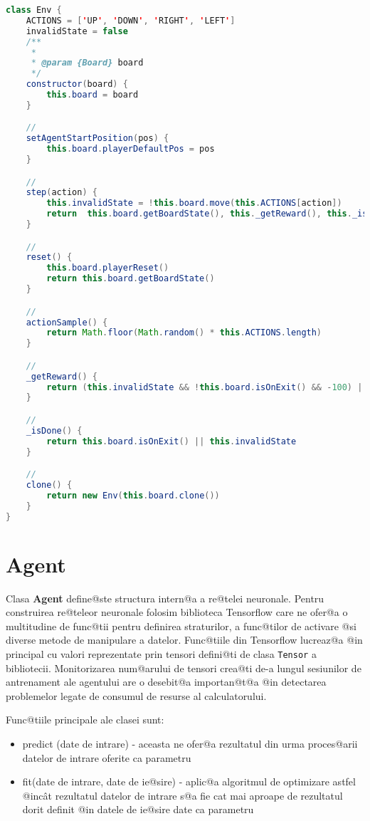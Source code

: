 \begin{lstlisting}[language=Java, caption=Definirea clasei Env]
class Env {
    ACTIONS = ['UP', 'DOWN', 'RIGHT', 'LEFT']
    invalidState = false
    /**
     * 
     * @param {Board} board 
     */
    constructor(board) {
        this.board = board
    }

    //
    setAgentStartPosition(pos) {
        this.board.playerDefaultPos = pos
    }

    // 
    step(action) {
        this.invalidState = !this.board.move(this.ACTIONS[action])
        return  this.board.getBoardState(), this._getReward(), this._isDone()]
    }

    //
    reset() {
        this.board.playerReset()
        return this.board.getBoardState()
    }

    //
    actionSample() {
        return Math.floor(Math.random() * this.ACTIONS.length)
    }

    //
    _getReward() {
        return (this.invalidState && !this.board.isOnExit() && -100) || this.board.getPlayerCellValue()
    }

    //
    _isDone() {
        return this.board.isOnExit() || this.invalidState
    }

    //
    clone() {
        return new Env(this.board.clone())
    }
}
\end{lstlisting}


\section{Agent}
 
Clasa \textbf{Agent} define@ste structura intern@a a re@telei neuronale. Pentru construirea re@teleor neuronale folosim biblioteca Tensorflow care ne ofer@a o multitudine de func@tii pentru definirea straturilor, a func@tilor de activare @si diverse metode de manipulare a datelor. Func@tiile din Tensorflow lucreaz@a @in principal cu valori reprezentate prin tensori defini@ti de clasa \texttt{Tensor} a bibliotecii. Monitorizarea num@arului de tensori crea@ti de-a lungul se\-si\-u\-ni\-lor de antrenament ale agentului are o desebit@a importan@t@a @in detectarea problemelor legate de consumul de resurse al calculatorului.

Func@tiile principale ale clasei sunt:
\begin{itemize}
	\item predict (date de intrare) - aceasta ne ofer@a rezultatul din urma proces@arii datelor de intrare oferite ca parametru
	\item fit(date de intrare, date de ie@sire) - aplic@a algoritmul de optimizare astfel @inc\^ at rezultatul datelor de intrare s@a fie cat mai aproape de rezultatul dorit definit @in datele de ie@sire date ca parametru
\end{itemize}

